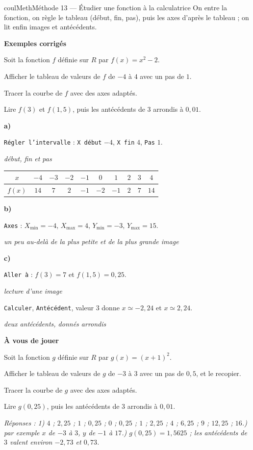 \documentclass[11pt,a4paper]{article}
\makeatletter
\newcommand{\R}{\mathbb{R}}
\newcommand{\N}{\mathbb{N}}
\newcommand{\Z}{\mathbb{Z}}
\newcommand{\Q}{\mathbb{Q}}
\renewcommand{\approx}{\simeq}
\newcommand{\vect}[1]{\overrightarrow{#1}}
\newcommand{\fois}[1]{\times{\color{coulExo}#1}}
\providecommand{\Cf}{\mathcal{C}\sb{f}}%
\providecommand{\Cg}{\mathcal{C}\sb{g}}%
\newcounter{lycee@signet}
\newcommand{\signet}[3][]{\stepcounter{lycee@signet}%
  \edef\lycee@dest{\if\relax\detokenize{#1}\relax
    signet.\arabic{lycee@signet}\else#1\fi}%
  \hypertarget{\lycee@dest}{}\bookmark[level=#2,dest=\lycee@dest]{#3}}
\def\R{R}\def\N{N}\def\Z{Z}\def\Q{Q}\def\vect#1{#1}\def\Cf{Cf}\def\Cg{Cg}\def\fois#1{×#1}%
\newcommand{\res}[1]{#1}
\newcounter{methode}
\newenvironment{methodebox}[1][Méthode]{\stepcounter{methode}%
  \begin{boitecours}[phantom={\signet[methode-\arabic{methode}]{2}{#1}}]{coulMeth}{#1}}%
  {\end{boitecours}}
\newcommand{\etape}[1]{\par\smallskip\textbf{\color{coulMeth}#1}\par\nobreak\smallskip}
\newcommand{\reponse}[1]{\par\smallskip
  {\footnotesize\itshape\color{black!55}Réponses : #1}}
\newcommand{\explique}[2]{\par\smallskip\noindent
  \begin{minipage}[t]{0.57\linewidth}\raggedright #1\end{minipage}\hfill
  \begin{minipage}[t]{0.40\linewidth}\raggedright\leavevmode
    {\small\itshape\color{black!60}#2}\end{minipage}\par}
\newcommand{\cas}[1]{\par\smallskip\noindent\textbf{\color{coulExo}#1}\vadjust{\nobreak}}
\newenvironment{correction}{\par}{\par}
\newcommand{\etapeexemples}{\etape{Exemples corrigés}}
\makeatother
\begin{document}
\begin{methodebox}[Méthode 13 --- Étudier une fonction à la calculatrice]
On entre la fonction, on règle le tableau (début, fin, pas), puis les axes d'après le
tableau ; on lit enfin images et antécédents.
\etapeexemples
Soit la fonction $f$ définie sur $\R$ par ${f(x)=x^{2}-2}$.
\begin{questions}[label=\alph*)]
  \item Afficher le tableau de valeurs de $f$ de $-4$ à $4$ avec un pas de $1$.
  \item Tracer la courbe de $f$ avec des axes adaptés.
  \item Lire $f(3)$ et $f(1{,}5)$, puis les antécédents de $3$ arrondis à $0{,}01$.
\end{questions}
\begin{correction}
\cas{a)}
\explique{\texttt{Régler l'intervalle} : \texttt{X début} $-4$, \texttt{X fin} $4$,
\texttt{Pas} $1$.}{début, fin et pas}
\begin{center}
\footnotesize
\renewcommand{\arraystretch}{1.2}
\begin{tabular}{|c|*{9}{c|}}
\hline
$x$ & $-4$ & $-3$ & $-2$ & $-1$ & $0$ & $1$ & $2$ & $3$ & $4$\\\hline
$f(x)$ & $14$ & $7$ & $2$ & $-1$ & $-2$ & $-1$ & $2$ & $7$ & $14$\\\hline
\end{tabular}
\end{center}
\cas{b)}
\explique{\texttt{Axes} : $X_{\min}=-4$, $X_{\max}=4$, $Y_{\min}=-3$, $Y_{\max}=15$.}{un
peu au-delà de la plus petite et de la plus grande image}
\cas{c)}
\explique{\texttt{Aller à} : $f(3)=\res{7}$ et $f(1{,}5)=\res{0{,}25}$.}{lecture d'une image}
\explique{\texttt{Calculer}, \texttt{Antécédent}, valeur $3$ donne $x\approx \res{-2{,}24}$ et
$x\approx \res{2{,}24}$.}{deux antécédents, donnés arrondis}
\end{correction}

\etape{À vous de jouer}
Soit la fonction $g$ définie sur $\R$ par ${g(x)=(x+1)^{2}}$.
\begin{questions}
  \item Afficher le tableau de valeurs de $g$ de $-3$ à $3$ avec un pas de $0{,}5$, et le
        recopier.
  \item Tracer la courbe de $g$ avec des axes adaptés.
  \item Lire $g(0{,}25)$, puis les antécédents de $3$ arrondis à $0{,}01$.
\end{questions}
\reponse{1\textdegree) $4$ ; $2{,}25$ ; $1$ ; $0{,}25$ ;
$0$ ; $0{,}25$ ; $1$ ; $2{,}25$ ; $4$ ; $6{,}25$ ; $9$ ; $12{,}25$ ; $16$.\;
2\textdegree) par exemple $x$ de $-3$ à $3$, $y$ de $-1$ à $17$.\;
3\textdegree) $g(0{,}25)=1{,}5625$ ;\; les antécédents de $3$ valent environ $-2{,}73$ et
$0{,}73$.}
\end{methodebox}
\end{document}
